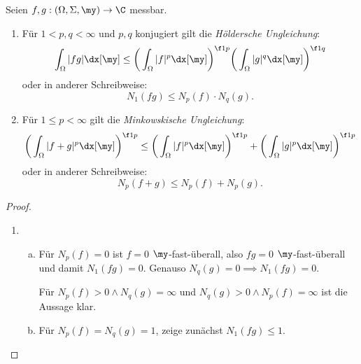 \begin{st} \label{2.7}
	Seien $f,g : (\Omega, \Sigma, \my) \to \C$ messbar.
	\begin{enumerate}[1)]
		\item
			Für $1 < p,q < \infty$ und $p,q$ konjugiert gilt die \emph{Höldersche Ungleichung}:
			\[
				\int_{\Omega} |fg| \dx[\my] \le \bigg(\int_{\Omega}|f|^p \dx[\my] \bigg)^{\f 1p} \bigg( \int_{\Omega} |g|^q \dx[\my] \bigg)^{\f 1q}
			\]
			oder in anderer Schreibweise:
			\[
				N_1(fg) \le N_p(f) \cdot N_q(g).
			\]
		\item
			Für $1 \le p < \infty$ gilt die \emph{Minkowskische Ungleichung}:
			\[
				\bigg( \int_{\Omega} |f+g|^p \dx[\my] \bigg)^{\f 1p} \le  \bigg(\int_{\Omega} |f|^p \dx[\my]\bigg)^{\f 1p} + \bigg( \int_{\Omega} |g|^p \dx[\my] \bigg)^{\f 1p}
			\]
			oder in anderer Schreibweise:
			\[
				N_p(f+g) \le N_p(f) + N_p(g).
			\]
	\end{enumerate}
	\begin{proof}
		\begin{enumerate}[1)]
			\item
				\begin{enumerate}[a)]
					\item
						Für $N_p(f) = 0$ ist $f =0 $ $\my$-fast-überall, also $fg = 0$ $\my$-fast-überall und damit $N_1(fg) = 0$.
						Genauso $N_q(g) = 0 \implies N_1(fg) = 0$.

						Für $N_p(f) > 0 \land N_q(g) = \infty$ und $N_q(g) > 0 \land N_p(f) = \infty$ ist die Aussage klar.
					\item
						Für $N_p(f) = N_q(g) = 1$, zeige zunächst $N_1(fg) \le 1$.


\end{enumerate}
\end{enumerate}
\end{proof}
\end{st}
